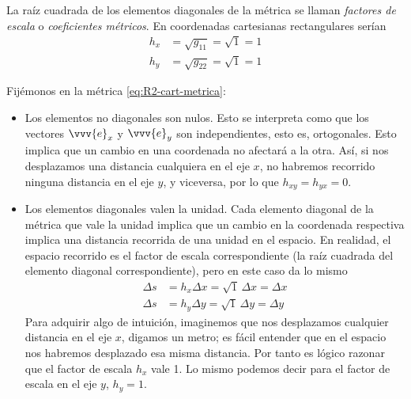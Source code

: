 La raíz cuadrada de los elementos diagonales de la métrica se llaman
\emph{factores de escala} o \emph{coeficientes métricos}.
En coordenadas cartesianas rectangulares serían
\begin{align*}
  h_x &= \sqrt{g_{11}} = \sqrt{1} = 1\\
  h_y &= \sqrt{g_{22}} = \sqrt{1} = 1  
\end{align*}

Fijémonos en la métrica \eqref{eq:R2-cart-metrica}:
\begin{itemize}
\item Los elementos no diagonales son nulos. Esto se interpreta como que los vectores
  $\vvv{e}_x$ y $\vvv{e}_y$ son independientes, esto es, ortogonales.
  Esto implica que un cambio en una coordenada no afectará a la otra. Así, si nos
  desplazamos una distancia cualquiera en el eje $x$, no habremos recorrido ninguna
  distancia en el eje $y$, y viceversa, por lo que $h_{xy}=h_{yx}=0$.
\item Los elementos diagonales valen la unidad. Cada elemento diagonal de la métrica que
  vale la unidad implica que un cambio en la coordenada respectiva implica una distancia
  recorrida de una unidad en el espacio. En realidad, el espacio recorrido es el factor
  de escala correspondiente (la raíz cuadrada del elemento diagonal correspondiente),
  pero en este caso da lo mismo
  \begin{subequations}
    \begin{align}
      \Delta s &= h_x \Delta x = \sqrt{1}\, \Delta x = \Delta x\\
      \Delta s &= h_y \Delta y = \sqrt{1}\, \Delta y = \Delta y
    \end{align}
  \end{subequations}
  Para adquirir algo de intuición, imaginemos que nos desplazamos cualquier distancia en
  el eje $x$, digamos un metro; es fácil entender que en el espacio nos habremos
  desplazado esa misma distancia. Por tanto es lógico razonar que el factor de escala
  $h_x$ vale 1. Lo mismo podemos decir para el factor de escala en el eje $y$, $h_y=1$.
\end{itemize}

